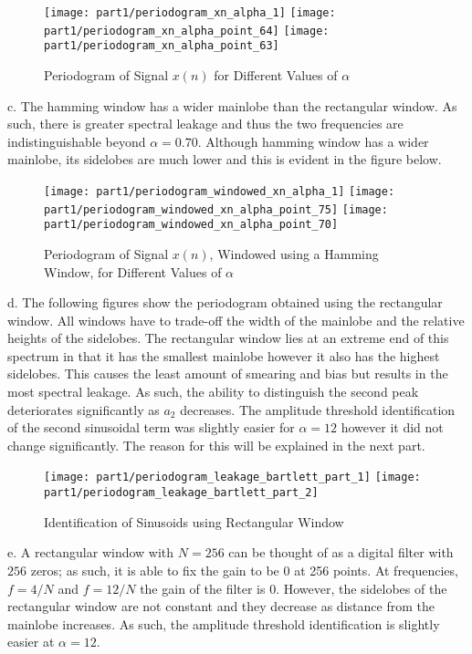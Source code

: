 \begin{figure}[H]
\centering{}
\texttt{[image: part1/periodogram\_xn\_alpha\_1]}
\texttt{[image: part1/periodogram\_xn\_alpha\_point\_64]}
\texttt{[image: part1/periodogram\_xn\_alpha\_point\_63]}
\caption{Periodogram of Signal $x(n)$ for Different Values of $\alpha$}
\end{figure}

\noindent{}c. The hamming window has a wider mainlobe than the rectangular window. As such, there is greater spectral leakage and thus the two frequencies are indistinguishable beyond $\alpha=0.70$. Although hamming window has a wider mainlobe, its sidelobes are much lower and this is evident in the figure below. 

\begin{figure}[H]
\centering{}
\texttt{[image: part1/periodogram\_windowed\_xn\_alpha\_1]}
\texttt{[image: part1/periodogram\_windowed\_xn\_alpha\_point\_75]}
\texttt{[image: part1/periodogram\_windowed\_xn\_alpha\_point\_70]}
\caption{Periodogram of Signal $x(n)$, Windowed using a Hamming Window, for Different Values of $\alpha$}
\end{figure}

\noindent{}d. The following figures show the periodogram obtained using the rectangular window. All windows have to trade-off the width of the mainlobe and the relative heights of the sidelobes. The rectangular window lies at an extreme end of this spectrum in that it has the smallest mainlobe however it also has the highest sidelobes. This causes the least amount of smearing and bias but results in the most spectral leakage. As such, the ability to distinguish the second peak deteriorates significantly as $a_2$ decreases. The amplitude threshold identification of the second sinusoidal term was slightly easier for $\alpha=12$ however it did not change significantly. The reason for this will be explained in the next part.

\begin{figure}[H]
\centering{}
\texttt{[image: part1/periodogram\_leakage\_bartlett\_part\_1]}
\texttt{[image: part1/periodogram\_leakage\_bartlett\_part\_2]}
\caption{Identification of Sinusoids using Rectangular Window}
\end{figure}

\noindent{}e. A rectangular window with $N=256$ can be thought of as a digital filter with $256$ zeros; as such, it is able to fix the gain to be 0 at 256 points. At frequencies, $f=4/N$ and $f=12/N$ the gain of the filter is 0. However, the sidelobes of the rectangular window are not constant and they decrease as distance from the mainlobe increases. As such, the amplitude threshold identification is slightly easier at $\alpha=12$.

